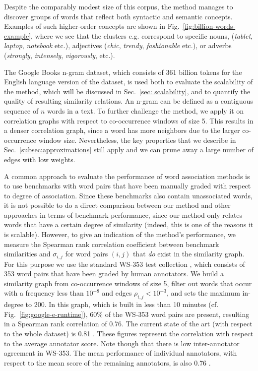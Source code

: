 \documentclass{sig-alternate}
\newcommand{\rn}[1]{\rho_{#1}}
\newcommand{\sy}[1]{\sigma_{#1}}
\begin{document}
Despite the comparably modest size of this corpus, the method
manages to discover groups of words that reflect both syntactic and semantic
concepts. Examples of such higher-order concepts are shown in Fig.\ \ref{fig:billion-words-example},
where we see that the clusters e.g. correspond to specific nouns,
 (\emph{tablet}, \emph{laptop}, \emph{notebook} etc.), adjectives
 (\emph{chic}, \emph{trendy}, \emph{fashionable} etc.), or adverbs
 (\emph{strongly}, \emph{intensely}, \emph{vigorously}, etc.).

\begin{sloppypar}
The Google Books n-gram dataset, which consists of 361
billion tokens for the English language version of the dataset, is used both to evaluate the scalability of the
method, which will be discussed in Sec.\ \ref{sec: scalability}, and to quantify the quality of resulting similarity
relations. An n-gram can be defined as a contiguous sequence of $n$ words in a text.
To further challenge the method, we apply it on correlation graphs with respect to co-occurrence
windows of size 5. This results in a denser correlation graph, since a
word has more neighbors due to the larger co-occurrence window size. Nevertheless, the
key properties that we describe in Sec.\ \ref{subsec:approximations} still
apply and we can prune away a large number of edges with low weights.
\end{sloppypar}

A common approach to evaluate the performance of word association methods is to use benchmarks
with word pairs that have been manually graded with respect to degree of association. Since these
benchmarks also contain unassociated words, it is not possible to do a direct comparison between our
method and other
approaches in terms of benchmark performance, since our method only relates words that have a certain
degree of similarity (indeed, this is one of the reasons it is scalable). However, to give an indication of
the method's performance, we measure the Spearman rank correlation coefficient between benchmark
similarities and $\sy{i,j}$ for word pairs $(i, j)$ that \emph{do} exist in the similarity graph. For this purpose we
use the standard WS-353 test collection \cite{Finkelstein01}, which consists of 353 word pairs that have
been graded by human annotators. We build a similarity graph from co-occurrence windows of size 5, filter
out words that occur with a frequency less than $10^{-8}$ and edges $\rn{i,j} < 10^{-3}$, and
sets the maximum in-degree to 200. In this graph, which is built in less than 10 minutes (cf. Fig.\ \ref{fig:google-e-runtime}),
60\% of the WS-353 word pairs are present, resulting in a Spearman rank correlation of 0.76. The current state of the
art (with respect to the whole dataset) is 0.81 \cite{Halawi12,Yih12}.
These figures represent the correlation with respect to the average annotator score. Note though
that there is low inter-annotator agreement in WS-353. The mean performance
of individual annotators, with respect to the mean score of the remaining annotators, is also 0.76 \cite{Hill14}.
\end{document}
